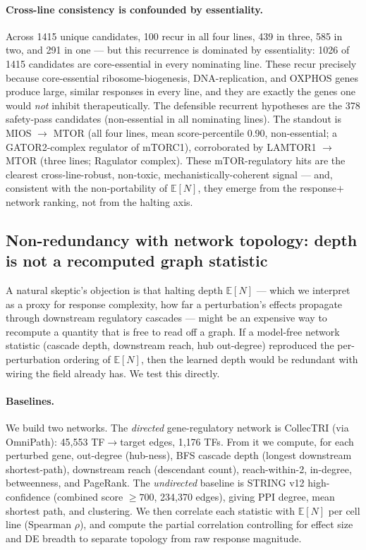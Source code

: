 \documentclass[11pt]{article}
\newcommand{\EN}{\ensuremath{\mathbb{E}[N]}}
\let\mathrho\rho
\renewcommand{\rho}{\ensuremath{\mathrho}}
\begin{document}
\paragraph{Cross-line consistency is confounded by essentiality.} Across 1415 unique candidates,
100 recur in all four lines, 439 in three, 585 in two, and 291 in one --- but this recurrence is
dominated by essentiality: 1026 of 1415 candidates are core-essential in every nominating line.
These recur precisely because core-essential ribosome-biogenesis, DNA-replication, and OXPHOS
genes produce large, similar responses in every line, and they are exactly the genes one would
\emph{not} inhibit therapeutically. The defensible recurrent hypotheses are the 378 safety-pass
candidates (non-essential in all nominating lines). The standout is MIOS $\rightarrow$ MTOR (all
four lines, mean score-percentile 0.90, non-essential; a GATOR2-complex regulator of mTORC1),
corroborated by LAMTOR1 $\rightarrow$ MTOR (three lines; Ragulator complex). These mTOR-regulatory
hits are the clearest cross-line-robust, non-toxic, mechanistically-coherent signal --- and,
consistent with the non-portability of \EN{}, they emerge from the response$+$network ranking, not
from the halting axis.

\subsection{Non-redundancy with network topology: depth is not a recomputed graph statistic}
\label{sec:grn}

A natural skeptic's objection is that halting depth \EN{} --- which we interpret as a proxy for
response complexity, how far a perturbation's effects propagate through downstream regulatory
cascades --- might be an expensive way to recompute a quantity that is free to read off a graph.
If a model-free network statistic (cascade depth, downstream reach, hub out-degree) reproduced the
per-perturbation ordering of \EN{}, then the learned depth would be redundant with wiring the
field already has. We test this directly.

\paragraph{Baselines.} We build two networks. The \emph{directed} gene-regulatory network is
CollecTRI (via OmniPath): 45{,}553 TF$\rightarrow$target edges, 1{,}176 TFs. From it we compute,
for each perturbed gene, out-degree (hub-ness), BFS cascade depth (longest downstream
shortest-path), downstream reach (descendant count), reach-within-2, in-degree, betweenness, and
PageRank. The \emph{undirected} baseline is STRING v12 high-confidence (combined score $\ge700$,
234{,}370 edges), giving PPI degree, mean shortest path, and clustering. We then correlate each
statistic with \EN{} per cell line (Spearman \rho{}), and compute the partial correlation
controlling for effect size and DE breadth to separate topology from raw response magnitude.
\end{document}
